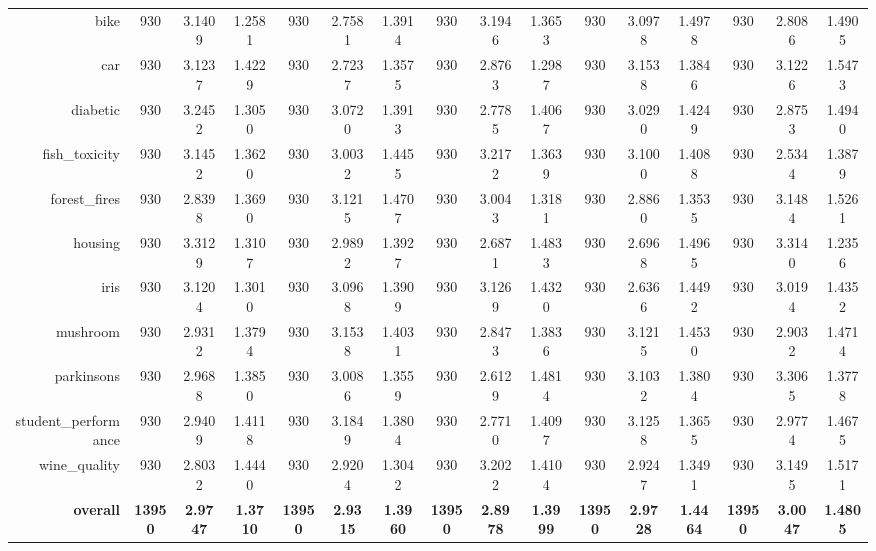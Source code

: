 \begin{table}[htbp]
{\begin{tabular}{rccccccccccccccc}
    bike  & 930   & 3.1409 & 1.2581 & 930   & \cellcolor[rgb]{ .776,  .937,  .808}\textcolor[rgb]{ 0,  .38,  0}{2.7581} & 1.3914 & 930   & 3.1946 & 1.3653 & 930   & 3.0978 & 1.4978 & 930   & 2.8086 & 1.4905 \\
    car   & 930   & 3.1237 & 1.4229 & 930   & \cellcolor[rgb]{ .776,  .937,  .808}\textcolor[rgb]{ 0,  .38,  0}{2.7237} & 1.3575 & 930   & 2.8763 & 1.2987 & 930   & 3.1538 & 1.3846 & 930   & 3.1226 & 1.5473 \\
    diabetic & 930   & 3.2452 & 1.3050 & 930   & 3.0720 & 1.3913 & 930   & \cellcolor[rgb]{ .776,  .937,  .808}\textcolor[rgb]{ 0,  .38,  0}{2.7785} & 1.4067 & 930   & 3.0290 & 1.4249 & 930   & 2.8753 & 1.4940 \\
    fish\_toxicity & 930   & 3.1452 & 1.3620 & 930   & 3.0032 & 1.4455 & 930   & 3.2172 & 1.3639 & 930   & 3.1000 & 1.4088 & 930   & \cellcolor[rgb]{ .776,  .937,  .808}\textcolor[rgb]{ 0,  .38,  0}{2.5344} & 1.3879 \\
    forest\_fires & 930   & \cellcolor[rgb]{ .776,  .937,  .808}\textcolor[rgb]{ 0,  .38,  0}{2.8398} & 1.3690 & 930   & 3.1215 & 1.4707 & 930   & 3.0043 & 1.3181 & 930   & 2.8860 & 1.3535 & 930   & 3.1484 & 1.5261 \\
    housing & 930   & 3.3129 & 1.3107 & 930   & 2.9892 & 1.3927 & 930   & \cellcolor[rgb]{ .776,  .937,  .808}\textcolor[rgb]{ 0,  .38,  0}{2.6871} & 1.4833 & 930   & 2.6968 & 1.4965 & 930   & 3.3140 & 1.2356 \\
    iris  & 930   & 3.1204 & 1.3010 & 930   & 3.0968 & 1.3909 & 930   & 3.1269 & 1.4320 & 930   & \cellcolor[rgb]{ .776,  .937,  .808}\textcolor[rgb]{ 0,  .38,  0}{2.6366} & 1.4492 & 930   & 3.0194 & 1.4352 \\
    mushroom & 930   & 2.9312 & 1.3794 & 930   & 3.1538 & 1.4031 & 930   & \cellcolor[rgb]{ .776,  .937,  .808}\textcolor[rgb]{ 0,  .38,  0}{2.8473} & 1.3836 & 930   & 3.1215 & 1.4530 & 930   & 2.9032 & 1.4714 \\
    parkinsons & 930   & 2.9688 & 1.3850 & 930   & 3.0086 & 1.3559 & 930   & \cellcolor[rgb]{ .776,  .937,  .808}\textcolor[rgb]{ 0,  .38,  0}{2.6129} & 1.4814 & 930   & 3.1032 & 1.3804 & 930   & 3.3065 & 1.3778 \\
    student\_performance & 930   & 2.9409 & 1.4118 & 930   & 3.1849 & 1.3804 & 930   & \cellcolor[rgb]{ .776,  .937,  .808}\textcolor[rgb]{ 0,  .38,  0}{2.7710} & 1.4097 & 930   & 3.1258 & 1.3655 & 930   & 2.9774 & 1.4675 \\
    wine\_quality & 930   & \cellcolor[rgb]{ .776,  .937,  .808}\textcolor[rgb]{ 0,  .38,  0}{2.8032} & 1.4440 & 930   & 2.9204 & 1.3042 & 930   & 3.2022 & 1.4104 & 930   & 2.9247 & 1.3491 & 930   & 3.1495 & 1.5171 \\
    \midrule
    \textbf{overall} & \textbf{13950} & \textbf{2.9747} & \textbf{1.3710} & \textbf{13950} & \textbf{2.9315} & \textbf{1.3960} & \textbf{13950} & \cellcolor[rgb]{ .776,  .937,  .808}\textcolor[rgb]{ 0,  .38,  0}{\textbf{2.8978}} & \textbf{1.3999} & \textbf{13950} & \textbf{2.9728} & \textbf{1.4464} & \textbf{13950} & \textbf{3.0047} & \textbf{1.4805} \\
    \end{tabular}%
    }


\end{table}
